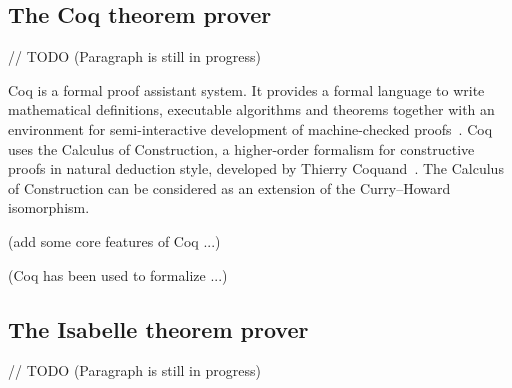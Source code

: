\documentclass[article]{aaltoseries}
\begin{document}


\subsection{The Coq theorem prover}
\label{sec:prover_coq}

// TODO (Paragraph is still in progress)

Coq is a formal proof assistant system. It provides a formal language to write mathematical definitions, executable algorithms and theorems together with an environment for semi-interactive development of machine-checked proofs~\cite{tool_Coq}. Coq uses the Calculus of Construction, a higher-order formalism for constructive proofs in natural deduction style, developed by Thierry Coquand~\cite{Coq86}. 
The Calculus of Construction can be considered as an extension of the Curry–Howard isomorphism. %

(add some core features of Coq ...)

(Coq has been used to formalize ...)


\subsection{The Isabelle theorem prover}
\label{sec:prover_isabelle}

// TODO (Paragraph is still in progress)
\end{document}
